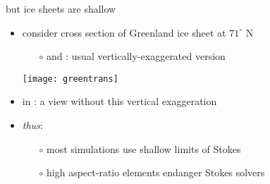 \documentclass{beamer}
\begin{document}
\begin{comment}
\begin{frame}{because ice is a slow fluid \dots}

\begin{itemize}
\item  geometry, boundary stress, and viscosity determine velocity field and pressure instantaneously (i.e.~in the Stokes model)

\bigskip
\item \emph{thus}: a time-stepping ice sheet code recomputes the velocity field at every time step, without requiring previous velocity \footnote{to be a weatherman you've got to know which way the wind blows \dots but not to be a glaciologist}
\end{itemize}
\end{frame}
\end{comment}


\begin{frame}{but ice sheets are shallow}

\begin{itemize}
\item consider cross section of Greenland ice sheet at $71^\circ$ N
\small
  \begin{itemize}
  \item[$\circ$] {\color{dark green}{green}} and {\color{dark blue}{blue}}: usual vertically-exaggerated version
  \end{itemize}
  \begin{center}
    \texttt{[image: greentrans]}
  \end{center}
\normalsize
\item in {\color{dark red}{red}}: a view without this vertical exaggeration
\item \emph{thus}: 
  \begin{itemize}
  \item[$\circ$] most simulations use shallow limits of Stokes
  \item[$\circ$] high aspect-ratio elements endanger Stokes solvers
  \end{itemize}
\end{itemize}
\end{frame}
\end{document}
